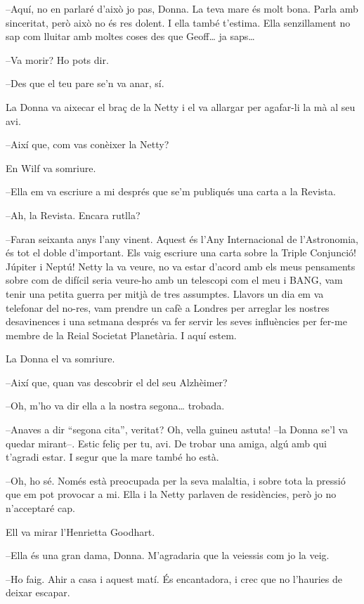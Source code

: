 --Aquí, no en parlaré d'això jo pas, Donna. La teva mare és molt bona.
Parla amb sinceritat, però això no és res dolent. I ella també t'estima.
Ella senzillament no sap com lluitar amb moltes coses des que
Geoff\ldots{} ja saps\ldots{}

--Va morir? Ho pots dir.

--Des que el teu pare se'n va anar, sí.

La Donna va aixecar el braç de la Netty i el va allargar per agafar-li
la mà al seu avi.

--Així que, com vas conèixer la Netty?

En Wilf va somriure.

--Ella em va escriure a mi després que se'm publiqués una carta a la
Revista.

--Ah, la Revista. Encara rutlla?

--Faran seixanta anys l'any vinent. Aquest és l'Any Internacional de
l'Astronomia, és tot el doble d'important. Els vaig escriure una carta
sobre la Triple Conjunció! Júpiter i Neptú! Netty la va veure, no va
estar d'acord amb els meus pensaments sobre com de difícil seria
veure-ho amb un telescopi com el meu i BANG, vam tenir una petita guerra
per mitjà de tres assumptes. Llavors un dia em va telefonar del no-res,
vam prendre un cafè a Londres per arreglar les nostres desavinences i
una setmana després va fer servir les seves influències per fer-me
membre de la Reial Societat Planetària. I aquí estem.

La Donna el va somriure.

--Així que, quan vas descobrir el del seu Alzhèimer?

--Oh, m'ho va dir ella a la nostra segona\ldots{} trobada.

--Anaves a dir ``segona cita'', veritat? Oh, vella guineu astuta! --la
Donna se'l va quedar mirant--. Estic feliç per tu, avi. De trobar una
amiga, algú amb qui t'agradi estar. I segur que la mare també ho està.

--Oh, ho sé. Només està preocupada per la seva malaltia, i sobre tota la
pressió que em pot provocar a mi. Ella i la Netty parlaven de
residències, però jo no n'acceptaré cap.

Ell va mirar l'Henrietta Goodhart.

--Ella és una gran dama, Donna. M'agradaria que la veiessis com jo la
veig.

--Ho faig. Ahir a casa i aquest matí. És encantadora, i crec que no
l'hauries de deixar escapar.

